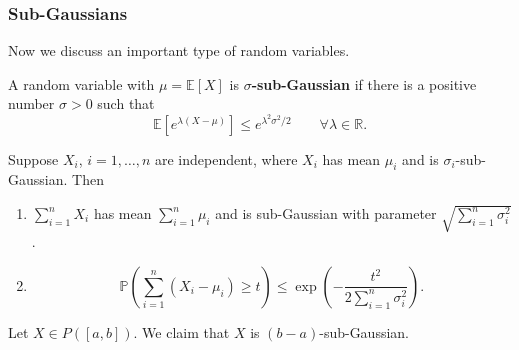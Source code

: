\subsubsection{Sub-Gaussians}
Now we discuss an important type of random variables.
\begin{defn}
A random variable with $\mu = \mathbb{E}[X]$ is \textbf{$\sigma$-sub-Gaussian} if there is a positive number $\sigma > 0$ such that
\[
\mathbb{E}[e^{\lambda(X-\mu)}] \leq e^{\lambda^2 \sigma^2 / 2} \qquad \forall \lambda \in \mathbb{R}.
\]
\end{defn}

\begin{prop}
Suppose $X_i$, $i = 1, \ldots, n$ are independent, where $X_i$ has mean $\mu_i$ and is $\sigma_i$-sub-Gaussian. Then
\begin{enumerate}
    \item $\sum_{i=1}^n X_i$ has mean $\sum_{i=1}^n \mu_i$ and is sub-Gaussian with parameter $\sqrt{\sum_{i=1}^n \sigma_i^2}$.
    \item 
    \[
    \mathbb{P}\!\left( \sum_{i=1}^n (X_i - \mu_i) \geq t \right) \leq \exp\!\left( -\frac{t^2}{2 \sum_{i=1}^n \sigma_i^2} \right).
    \]
\end{enumerate}
\end{prop}
\begin{exam}
Let $X \in P([a, b])$. We claim that $X$ is $(b-a)$-sub-Gaussian.
\end{exam}

